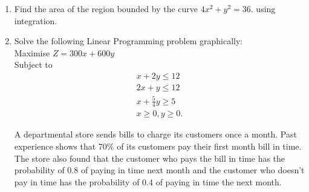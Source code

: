 \documentclass{article}
\begin{document}
\begin{enumerate}
\item Find the area of the region bounded by the curve $ 4x^2 + y^2 =36$. using integration.


\item Solve the following Linear Programming problem graphically:\\ Maximise $Z=300x + 600y $\\
	Subject to \begin{align}x + 2y \le 12\\
		2x + y \le 12\\
		x +\frac{5}{4}y \ge 5\\
		x \ge 0 , y \ge 0.\end{align} 

		A departmental store sends bills to charge its customers once a month. Past experience shows that 70\% of its customers pay their first month bill in time. The store also found that the customer who pays the bill in time has the probability of 0.8 of paying in time next month and the customer who doesn't pay in time has the probability of 0.4 of paying in time the next month.


\end{enumerate}
\end{document}
